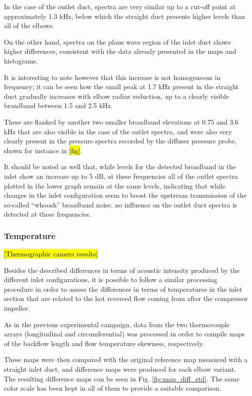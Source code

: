In the case of the outlet duct, spectra are very similar up to a cut-off point at approximately 1.3 kHz, below which the straight duct presents higher levels than all of the elbows.

On the other hand, spectra on the plane wave region of the inlet duct shows higher differences, consistent with the data already presented in the maps and histograms. 

It is interesting to note however that this increase is not homogeneous in frequency; it can be seen how the small peak at 1.7 kHz present in the straight duct gradually increases with elbow radius reduction, up to a clearly visible broadband between 1.5 and 2.5 kHz.

These are flanked by another two smaller broadband elevations at 0.75 and 3.6 kHz that are also visible in the case of the outlet spectra, and were also very clearly present in the pressure spectra recorded by the diffuser pressure probe, shown for instance in \hl{[fig]}.

It should be noted as well that, while levels for the detected broadband in the inlet show an increase up to 5 dB, at these frequencies all of the outlet spectra plotted in the lower graph remain at the same levels, indicating that while changes in the inlet configuration seem to boost the upstream transmission of the so-called ``whoosh'' broadband noise, no influence on the outlet duct spectra is detected at these frequencies.

\subsubsection{Temperature}

\hl{[Thermographic camera results]}

Besides the described differences in terms of acoustic intensity produced by the different inlet configurations, it is possible to follow a similar processing procedure in order to assess the differences in terms of temperatures in the inlet section that are related to the hot reversed flow coming from after the compressor impeller.

As in the previous experimental campaign, data from the two thermocouple arrays (longitudinal and circumferential) was processed in order to compile maps of the backflow length and flow temperature skewness, respectively.

These maps were then compared with the original reference map measured with a straight inlet duct, and difference maps were produced for each elbow variant. The resulting difference maps can be seen in Fig. \ref{fig:map_diff_std}. The same color scale has been kept in all of them to provide a suitable comparison.

